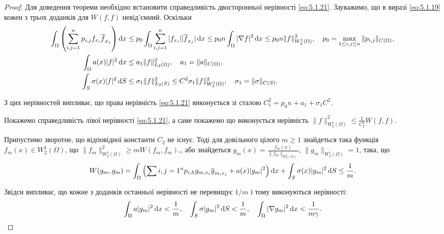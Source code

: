 \begin{proof}
    Для доведення теореми необхідно встановити справедливість двосторонньої нерівності \eqref{eq:5.1.21}. Зауважимо, що в виразі \eqref{eq:5.1.19} кожен з трьох доданків для $W(f,f)$ невід'ємний. Оскільки
    \begin{align*}
        \int_\Omega \left( \sum_{i,j=1}^n p_{i,j} f_{x_i} \overline{f}_{x_j} \right) \diff x
        &\le p_0 \int_\Omega \sum_{i,j=1}^n |f_{x_i}| |\overline{f}_{x_j}| \diff x \le p_0 n \int_\Omega |\nabla f|^2 \diff x \le p_0 n \|f\|_{W_2^1(\Omega)}^2, \quad p_0 = \max_{1\le i,j\le n}\|p_{i,j}\|_{C(\Omega)}, \\

        \int_\Omega a(x) |f|^2 \diff x
        &\le a_1 \|f\|_{L_2(\Omega)}^2, \quad a_1 = \|a\|_{C(\Omega)}, \\

        \int_S \sigma(x) |f|^2 \diff S
        &\le \sigma_1 \|f\|_{L_2(S)}^2 \le C^2 \sigma_1 \|f\|_{W_2^1(\Omega)}^2, \quad \sigma_1 = \|\sigma\|_{C(S)}.
    \end{align*}

    З цих нерівностей випливає, що права нерівність \eqref{eq:5.1.21} виконується зі сталою $C_1^2 = p_0 n + a_1 + \sigma_1 C^2$. \medskip

    Покажемо справедливість лівої нерівності \eqref{eq:5.1.21}, а саме покажемо що виконується нерівність $\|f\|_{W_2^1(\Omega)}^2 \le \frac{1}{C_2^2} W(f, f)$. \medskip

    Припустимо зворотне, що відповідної константи $C_2$ не існує. Тоді для довільного цілого $m \ge 1$ знайдеться така функція $f_m(x) \in W_2^1(\Omega)$, що $\|f_m\|_{W_2^1(\Omega)}^2 \ge m W(f_m, f_m)$,, або знайдеться $g_m(x) = \frac{f_m(x)}{\|f_m\|_{W_2^1(\Omega)}}$, $\|g_m\|_{W_2^1(\Omega)} = 1$, така, що
    \begin{equation*}
        W(g_m, g_m) = \int_\Omega \left( \sum{i,j=1}^np_{i,h} g_{m, x_i} \overline{g}_{m, x_j} + a(x) |g_m|^2 \right) \mathop{}\!\mathrm{d} x + \int_S \sigma(x) |g_m|^2 \mathop{}\!\mathrm{d} S \le \frac{1}{m}.     
    \end{equation*}

    Звідси випливає, що кожне з доданків останньої нерівності не перевищує $1/m$ і тому виконуються нерівності:
    \begin{equation}
        \label{eq:5.1.23}
        \int_\Omega a|g_m|^2 \mathop{}\!\mathrm{d} x < \frac{1}{m}, \quad \int_S \sigma |g_m|^2 \mathop{}\!\mathrm{d} S < \frac{1}{m}, \quad \int_\Omega |\nabla g_m|^2 \mathop{}\!\mathrm{d} x < \frac{1}{m \gamma}.
    \end{equation}


\end{proof}
